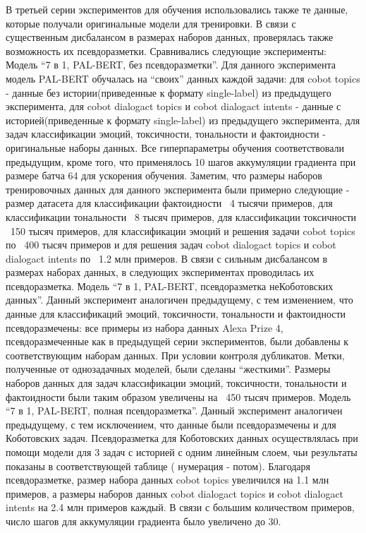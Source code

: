 В  третьей серии экспериментов для обучения использовались также те данные, которые получали оригинальные модели для тренировки. В связи с существенным дисбалансом в размерах наборов данных, проверялась также возможность их псевдоразметки. Сравнивались следующие эксперименты:                                     
Модель “7 в 1, PAL-BERT, без псевдоразметки”. Для данного эксперимента модель PAL-BERT обучалась на “своих” данных каждой задачи: для cobot topics - данные без истории(приведенные к формату single-label) из предыдущего эксперимента, для cobot dialogact topics и cobot dialogact intents - данные с историей(приведенные к формату single-label) из предыдущего эксперимента, для задач классификации эмоций, токсичности, тональности и фактоидности - оригинальные наборы данных. Все гиперпараметры обучения соответствовали предыдущим, кроме того, что применялось 10 шагов аккумуляции градиента при размере батча 64 для ускорения обучения.
Заметим, что размеры наборов тренировочных данных для данного эксперимента были примерно следующие - размер датасета для классификации фактоидности ~4 тысячи примеров, для классификации тональности ~8 тысяч примеров, для классификации токсичности ~150 тысяч примеров, для классификации эмоций и решения задачи cobot topics по ~400 тысяч примеров и для решения задач cobot dialogact topics и cobot dialogact intents по ~1.2 млн примеров. В связи с сильным дисбалансом в размерах наборах данных, в следующих экспериментах проводилась их псевдоразметка.
Модель “7 в 1, PAL-BERT, псевдоразметка неКоботовских данных”. Данный эксперимент аналогичен предыдущему, с тем изменением, что данные для классификаций эмоций, токсичности, тональности и фактоидности псевдоразмечены: все примеры из набора данных Alexa Prize 4, псевдоразмеченные как в предыдущей серии экспериментов, были добавлены к соответствующим наборам данных. При условии контроля дубликатов. Метки, полученные от однозадачных моделей, были сделаны “жесткими”. Размеры наборов данных для задач классификации эмоций, токсичности, тональности и фактоидности были таким образом увеличены на ~450 тысяч примеров. 
Модель “7  в 1, PAL-BERT, полная псевдоразметка”. Данный эксперимент аналогичен предыдущему, с тем исключением, что данные были псевдоразмечены и для Коботовских задач.  Псевдоразметка для Коботовских данных осуществлялась при помощи модели для 3 задач с историей с одним линейным слоем, чьи результаты показаны в соответствующей таблице ( нумерация - потом). Благодаря псевдоразметке, размер набора данных  cobot topics увеличился на 1.1 млн примеров, а размеры наборов данных cobot dialogact topics и cobot dialogact intents на 2.4 млн примеров каждый. В связи с большим количеством примеров, число шагов для аккумуляции градиента было увеличено до 30.
